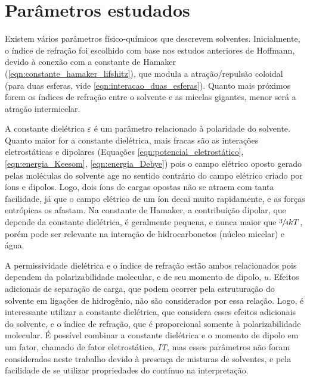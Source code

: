	\chapter{Parâmetros estudados}
	\label{sec:parametros_estudados}
		
		Existem vários parâmetros físico-químicos que descrevem solventes. Inicialmente, o índice de refração foi escolhido com base nos estudos anteriores de Hoffmann, devido à conexão com a constante de Hamaker (\autoref{eqn:constante_hamaker_lifshitz}), que modula a atração/repulsão coloidal (para duas esferas, vide \autoref{eqn:interacao_duas_esferas}). Quanto mais próximos forem os índices de refração entre o solvente e as micelas gigantes, menor será a atração intermicelar.  
		
		A constante dielétrica \(\varepsilon\) é um parâmetro relacionado à polaridade do solvente. Quanto maior for a constante dielétrica, mais fracas são as interações eletrostáticas e dipolares (Equações \ref{eqn:potencial_eletrostático}, \ref{eqn:energia_Keesom}, \ref{eqn:energia_Debye}) pois o campo elétrico oposto gerado pelas moléculas do solvente age no sentido contrário do campo elétrico criado por íons e dipolos. Logo, dois íons de cargas opostas não se atraem com tanta facilidade, já que o campo elétrico de um íon decai muito rapidamente, e as forças entrópicas os afastam. Na constante de Hamaker, a contribuição dipolar, que depende da constante dielétrica, é geralmente pequena, e nunca maior que \(\sfrac{3}{4}kT\), porém pode ser relevante na interação de hidrocarbonetos (núcleo micelar) e água.   
		
		A permissividade dielétrica e o índice de refração estão ambos relacionados pois dependem da polarizabilidade molecular, e de seu momento de dipolo, \(u\). Efeitos adicionais de separação de carga, que podem ocorrer pela estruturação do solvente em ligações de hidrogênio, não são considerados por essa relação. Logo, é interessante utilizar a constante dielétrica, que considera esses efeitos adicionais do solvente, e o índice de refração, que é proporcional somente à polarizabilidade molecular. É possível combinar a constante dielétrica e o momento de dipolo em um fator, chamado de fator eletrostático, \emph{IT}, mas esses parâmetros não foram considerados neste trabalho devido à presença de misturas de solventes, e pela facilidade de se utilizar propriedades do contínuo na interpretação.\cite{ReichardtSolvents}
		
